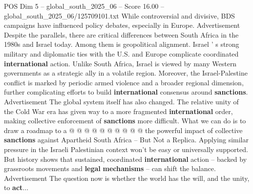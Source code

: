 \begin{textsample}{POS Dim 5 – global\_south\_2025\_06 – Score 16.00 – global\_south\_2025\_06/125709101.txt}
While controversial and divisive, BDS campaigns have influenced policy debates, especially in Europe.
Advertisement Despite the parallels, there are critical differences between South Africa in the 1980s and Israel today.
Among them is geopolitical alignment.
Israel ' s strong military and diplomatic ties with the U.S. and Europe complicate coordinated \textbf{international} action.
Unlike South Africa, Israel is viewed by many Western governments as a strategic ally in a volatile region.
Moreover, the Israel-Palestine conflict is marked by periodic armed violence and a broader regional dimension, further complicating efforts to build \textbf{international} consensus around \textbf{sanctions}.
Advertisement The global system itself has also changed.
The relative unity of the Cold War era has given way to a more fragmented \textbf{international} order, making collective enforcement of \textbf{sanctions} more difficult.
What we can do is to draw a roadmap to a @ @ @ @ @ @ @ @ @ @ the powerful impact of collective \textbf{sanctions} against Apartheid South Africa -- But Not a Replica.
Applying similar pressure in the Israeli Palestinian context won't be easy or universally supported.
But history shows that sustained, coordinated \textbf{international} action -- backed by grassroots movements and \textbf{legal} \textbf{mechanisms} -- can shift the balance.
Advertisement The question now is whether the world has the will, and the unity, to \textbf{act}...

\end{textsample}
